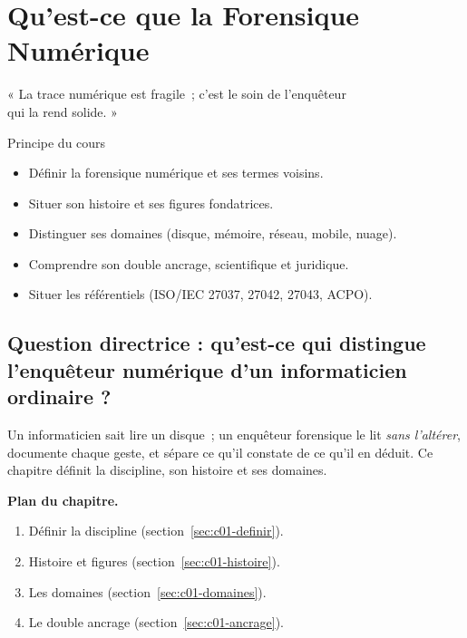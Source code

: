 
\chapter{Qu'est-ce que la Forensique Numérique}
\label{chap:forensique}

\epigraph{%
    « La trace numérique est fragile~; c'est le soin de l'enquêteur\\
    qui la rend solide. »%
}{Principe du cours}


\begin{boxobjectifs}
\begin{itemize}
    \item Définir la forensique numérique et ses termes voisins.
    \item Situer son histoire et ses figures fondatrices.
    \item Distinguer ses domaines (disque, mémoire, réseau, mobile, nuage).
    \item Comprendre son double ancrage, scientifique et juridique.
    \item Situer les référentiels (ISO/IEC 27037, 27042, 27043, ACPO).
\end{itemize}
\end{boxobjectifs}

\bigskip

\section*{Question directrice : qu'est-ce qui distingue l'enquêteur numérique d'un informaticien ordinaire ?}

Un informaticien sait lire un disque~; un enquêteur forensique le lit
\emph{sans l'altérer}, documente chaque geste, et sépare ce qu'il constate de
ce qu'il en déduit. Ce chapitre définit la discipline, son histoire et ses
domaines.

\medskip
\textbf{Plan du chapitre.}
\begin{enumerate}
    \item Définir la discipline (section~\ref{sec:c01-definir}).
    \item Histoire et figures (section~\ref{sec:c01-histoire}).
    \item Les domaines (section~\ref{sec:c01-domaines}).
    \item Le double ancrage (section~\ref{sec:c01-ancrage}).
\end{enumerate}

